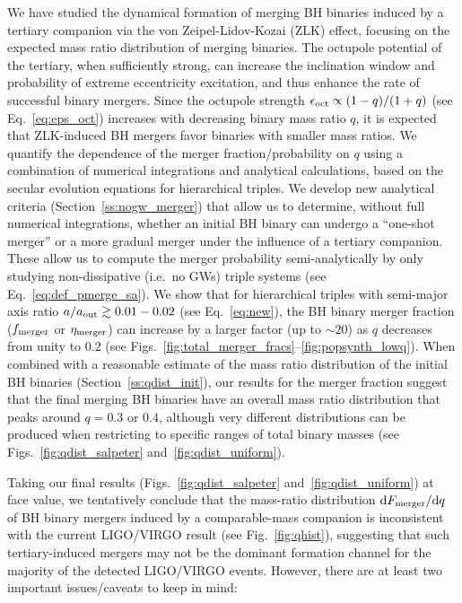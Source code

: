 \documentclass[
        fleqn,
        usenatbib,
    ]{mnras}
\newcommand*{\md}[0]{\mathrm{d}}
\begin{document}
We have studied the dynamical formation of merging BH binaries induced by a
tertiary companion via the von Zeipel-Lidov-Kozai (ZLK) effect, focusing on the
expected mass ratio distribution of merging binaries. The octupole potential of
the tertiary, when sufficiently strong, can increase the inclination
window and probability of extreme eccentricity excitation, and thus enhance the
rate of successful binary mergers. Since the octupole strength $\epsilon_{\rm
oct} \propto (1-q)/(1+q)$ (see Eq.~\ref{eq:eps_oct}) increases with decreasing
binary mass ratio $q$, it is expected that ZLK-induced BH mergers favor binaries
with smaller mass ratios. We quantify the dependence of the merger
fraction/probability on $q$ using a combination of numerical integrations and
analytical calculations, based on the secular evolution equations for
hierarchical triples. We develop new analytical criteria
(Section~\ref{ss:nogw_merger}) that allow us to determine, without full
numerical integrations, whether an initial BH binary can undergo a ``one-shot
merger'' or a more gradual merger under the influence of a tertiary companion.
These allow us to compute the merger probability semi-analytically by only
studying non-dissipative (i.e.\ no GWs) triple systems (see
Eq.~\ref{eq:def_pmerge_sa}). We show that for hierarchical triples with
semi-major axis ratio $a/a_{\rm out}\gtrsim 0.01-0.02$ (see Eq.~\ref{eq:new}),
the BH binary merger fraction ($f_{\rm merger}$ or $\eta_{\rm merger}$) can
increase by a larger factor (up to $\sim 20$) as $q$ decreases from unity to
$0.2$ (see Figs.~\ref{fig:total_merger_fracs}--\ref{fig:popsynth_lowq}). When
combined with a reasonable estimate of the mass ratio distribution of the
initial BH binaries (Section~\ref{ss:qdist_init}), our results for the merger
fraction suggest that the final merging BH binaries have an overall mass ratio
distribution that peaks around $q = 0.3$ or $0.4$, although very different
distributions can be produced when restricting to specific ranges of total
binary masses (see Figs.~\ref{fig:qdist_salpeter} and~\ref{fig:qdist_uniform}).

Taking our final results (Figs.~\ref{fig:qdist_salpeter}
and~\ref{fig:qdist_uniform}) at face value, we tentatively conclude that the
mass-ratio distribution $\md F_{\rm merger}/\md q$ of BH binary mergers induced
by a comparable-mass companion is inconsistent with the current LIGO/VIRGO
result (see Fig.~\ref{fig:qhist}), suggesting that such tertiary-induced mergers
may not be the dominant formation channel for the majority of the detected
LIGO/VIRGO events. However, there are at least two important issues/caveats to
keep in mind:
\end{document}
